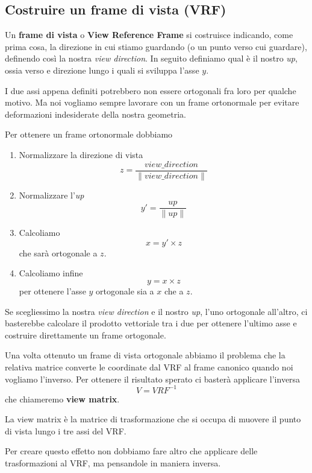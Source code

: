 \subsection{Costruire un frame di vista (VRF)}
Un \textbf{frame di vista} o \textbf{View Reference Frame} si costruisce indicando, come prima cosa, la direzione in cui
stiamo guardando (o un punto verso cui guardare), definendo cos\`i la nostra \emph{view direction}. In seguito definiamo
qual \`e il nostro \emph{up}, ossia verso e direzione lungo i quali si sviluppa l'asse $y$.

I due assi appena definiti potrebbero non essere ortogonali fra loro per qualche motivo. Ma noi vogliamo sempre lavorare
con un frame ortonormale per evitare deformazioni indesiderate della nostra geometria.

Per ottenere un frame ortonormale dobbiamo
\begin{enumerate}
	\item Normalizzare la direzione di vista
	      \[ z = \frac{view\_direction}{\| view\_direction \|} \]
	\item Normalizzare l'\emph{up}
	      \[ y' = \frac{up}{\| up \|} \]
	\item Calcoliamo
	      \[ x = y' \times z \]
	      che sar\`a ortogonale a $z$.
	\item Calcoliamo infine
	      \[ y = x \times z \]
	      per ottenere l'asse $y$ ortogonale sia a $x$ che a $z$.
\end{enumerate}
Se scegliessimo la nostra \emph{view direction} e il nostro \emph{up}, l'uno ortogonale all'altro, ci basterebbe
calcolare il prodotto vettoriale tra i due per ottenere l'ultimo asse e costruire direttamente un frame ortogonale.

Una volta ottenuto un frame di vista ortogonale abbiamo il problema che la relativa matrice converte le coordinate dal
VRF al frame canonico quando noi vogliamo l'inverso. Per ottenere il risultato sperato ci baster\`a applicare l'inversa
\[ V = VRF^{-1} \]
che chiameremo \textbf{view matrix}.


La view matrix \`e la matrice di trasformazione che si occupa di muovere il punto di vista lungo i tre assi del VRF.

Per creare questo effetto non dobbiamo fare altro che applicare delle trasformazioni al VRF, ma pensandole in maniera
inversa.

